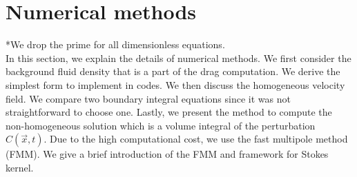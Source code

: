 \section{Numerical methods}
*We drop the prime for all dimensionless equations. 
\\
In this section, we explain the details of numerical methods. We first consider the background fluid density that is a part of the drag computation. We derive the simplest form to implement in codes. We then discuss the homogeneous velocity field. We compare two boundary integral equations since it was not straightforward to choose one. Lastly, we present the method to compute the non-homogeneous solution which is a volume integral of the perturbation $C(\vec{x},t)$. Due to the high computational cost, we use the fast multipole method (FMM). We give a brief introduction of the FMM and framework for Stokes kernel.
